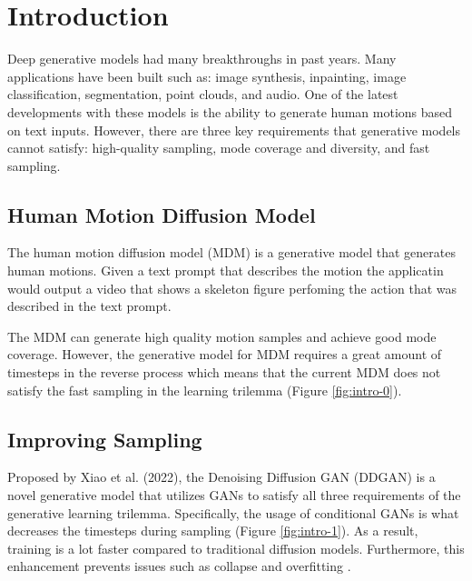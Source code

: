 \documentclass[10pt,twocolumn,letterpaper]{article}
\begin{document}
\section{Introduction}
\label{sec:intro}

Deep generative models had many breakthroughs in past years. Many applications have been built such as: 
image synthesis, inpainting, image classification, segmentation, point clouds, and audio. One of the latest developments with 
these models is the ability to generate human motions based on text inputs. However, there are three key requirements 
that generative models cannot satisfy: high-quality sampling, mode coverage and diversity, and fast sampling. 

\subsection{Human Motion Diffusion Model}

The human motion diffusion model (MDM) is a generative model that generates human motions. Given a text prompt 
that describes the motion the applicatin would output a video that shows a skeleton figure perfoming the 
action that was described in the text prompt. 

The MDM can generate high quality motion samples and achieve good mode coverage. 
However, the generative model for MDM requires a great amount of timesteps in the reverse process which means 
that the current MDM does not satisfy the fast sampling in the learning trilemma (Figure \ref{fig:intro-0}). 

\subsection{Improving Sampling}

Proposed by Xiao et al. (2022), the Denoising Diffusion GAN (DDGAN) is a novel generative model that utilizes 
GANs to satisfy all three requirements of the generative learning trilemma. Specifically, the usage of 
conditional GANs is what decreases the timesteps during sampling (Figure \ref{fig:intro-1}). As a result, training is a lot faster 
compared to traditional diffusion models. Furthermore, this enhancement prevents issues such as collapse and 
overfitting \cite{Xiao22}.
\end{document}
